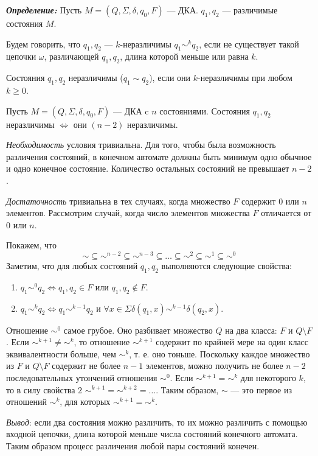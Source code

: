 \textit{\textbf{Определение:}} Пусть $M = (Q,\Sigma, \delta, q_0, F)$ --- ДКА. $q_1, q_2$ --- различимые состояния $M$.

Будем говорить, что $q_1, q_2$ --- $k$-неразличимы $q_1 \sim^k q_2$, если не существует такой цепочки $\omega$, различающей $q_1, q_2$, длина которой меньше или равна $k$.

Состояния $q_1, q_2$ неразличимы ($q_1 \sim q_2$), если они $k$-неразличимы при любом $k \geq 0$.

\begin{mylemma}
Пусть $M = (Q,\Sigma, \delta, q_0, F)$ --- ДКА c $n$ состояниями. Состояния $q_1, q_2$ неразличимы $\Leftrightarrow$ они $(n-2)$ неразличимы.
\end{mylemma}
\begin{myproof}
\textit{Необходимость} условия тривиальна. Для того, чтобы была возможность различения состояний, в конечном автомате должны быть минимум одно обычное и одно конечное состояние. Количество остальных состояний не превышает $n-2$.

\textit{Достаточность} тривиальна в тех случаях, когда множество $F$ содержит $0$ или $n$ элементов. Рассмотрим случай, когда число элементов множества $F$ отличается от $0$ или $n$.

Покажем, что
\[ \sim \subseteq \sim^{n-2} \subseteq \sim^{n-3} \subseteq \ldots \subseteq \sim^{2} \subseteq \sim^{1}  \subseteq \sim^{0} \]
Заметим, что для любых состояний $q_1, q_2$ выполняются следующие свойства:
\begin{enumerate}
\item $q_1 \sim^0 q_2 \Leftrightarrow q_1, q_2 \in F$ или $q_1, q_2 \notin F$.
\item $q_1 \sim^k q_2 \Leftrightarrow q_1 \sim^{k-1} q_2$ и $ \forall x \in \Sigma \delta(q_1, x) \sim^{k-1} \delta(q_2, x)$.
\end{enumerate}
Отношение $\sim^0$ самое грубое. Оно разбивает множество $Q$ на два класса: $F$ и $Q \setminus F$. Если $\sim^{k+1} \neq \sim^k$, то отношение $\sim^{k+1}$ содержит по крайней мере на один класс эквивалентности больше, чем $\sim^k$, т. е. оно тоньше. Поскольку каждое множество из $F$ и $Q \setminus F$ содержит не более $n-1$ элементов, можно получить не более $n-2$ последовательных утончений отношения $\sim^0$. Если $\sim^{k+1} = \sim^{k}$ для некоторого $k$, то в силу свойства $2$ $\sim^{k+1} = \sim^{k+2} = \ldots$. Таким образом, $\sim$ --- это первое из отношений $\sim^{k}$, для которых $\sim^{k+1} = \sim^{k}$.
\end{myproof}
\textit{Вывод}: если два состояния можно различить, то их можно различить с помощью входной цепочки, длина которой меньше числа состояний конечного автомата. Таким образом процесс различения любой пары состояний конечен.

